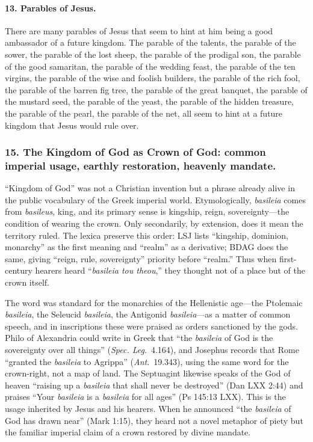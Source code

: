 \paragraph{13.
Parables of Jesus.}\label{par:parables-of-jesus.}
There are many parables of Jesus that seem to hint at him being a good ambassador of a future kingdom.
The parable of the talents, the parable of the sower, the parable of the lost sheep, the parable of the prodigal son, the parable of the good samaritan, the parable of the wedding feast, the parable of the ten virgins, the parable of the wise and foolish builders, the parable of the rich fool, the parable of the barren fig tree, the parable of the great banquet, the parable of the mustard seed, the parable of the yeast, the parable of the hidden treasure, the parable of the pearl, the parable of the net, all seem to hint at a future kingdom that Jesus would rule over.

\subsubsection{15.
The Kingdom of God as Crown of God: common imperial usage, earthly restoration, heavenly mandate.}\label{subsubsec:the-kingdom-of-god-as-crown-of-god-common-imperial-usage-earthly-restoration-heavenly-mandate}
“Kingdom of God” was not a Christian invention but a phrase already alive in the public vocabulary of the Greek imperial world.
Etymologically, \emph{basileia} comes from \emph{basileus}, king, and its primary sense is kingship, reign, sovereignty—the condition of wearing the crown.
Only secondarily, by extension, does it mean the territory ruled.
The lexica preserve this order: LSJ lists “kingship, dominion, monarchy” as the first meaning and “realm” as a derivative; BDAG does the same, giving “reign, rule, sovereignty” priority before “realm.”
Thus when first-century hearers heard “\emph{basileia tou theou},” they thought not of a place but of the crown itself.

The word was standard for the monarchies of the Hellenistic age—the Ptolemaic \emph{basileia}, the Seleucid \emph{basileia}, the Antigonid \emph{basileia}—as a matter of common speech, and in inscriptions these were praised as orders sanctioned by the gods.
Philo of Alexandria could write in Greek that “the \emph{basileia} of God is the sovereignty over all things” (\emph{Spec. Leg}.~4.164), and Josephus records that Rome “granted the \emph{basileia} to Agrippa” (\emph{Ant}.~19.343), using the same word for the crown-right, not a map of land.
The Septuagint likewise speaks of the God of heaven “raising up a \emph{basileia} that shall never be destroyed” (Dan LXX 2:44) and praises “Your \emph{basileia} is a \emph{basileia} for all ages” (Ps 145:13 LXX).
This is the usage inherited by Jesus and his hearers.
When he announced “the \emph{basileia} of God has drawn near” (Mark 1:15), they heard not a novel metaphor of piety but the familiar imperial claim of a crown restored by divine mandate.


